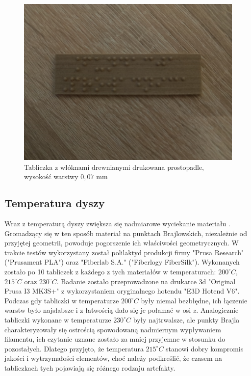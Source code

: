\documentclass[12pt,a4paper]{article}
\begin{document}
\begin{figure}
\includegraphics[width=\linewidth]{sgn_wood.jpg}
\caption{Tabliczka z włóknami drewnianymi drukowana prostopadle, wysokość warstwy $0{,}07 \text{ mm}$}
\end{figure}

\subsection{Temperatura dyszy}
Wraz z temperaturą dyszy zwiększa się nadmiarowe wyciekanie materiału \cite{3dparameters}. Gromadzący się w ten sposób materiał na punktach Brajlowskich, niezależnie od przyjętej geometrii, powoduje pogorszenie ich właściwości geometrycznych.
W trakcie testów wykorzystany został polilaktyd produkcji firmy "Prusa Research" ("Prusament PLA") oraz "Fiberlab S.A." ("Fiberlogy FiberSilk"). Wykonanych zostało po 10 tabliczek z każdego z tych materiałów w temperaturach: $200^{\circ} C$, $215^{\circ} C$ oraz $230^{\circ} C$. Badanie zostało przeprowadzone na drukarce 3d "Original Prusa I3 MK3S+" z wykorzystaniem oryginalnego hotendu "E3D Hotend V6".
Podczas gdy tabliczki w temperaturze $200^{\circ} C$ były niemal bezbłędne, ich łączenie warstw było najsłabsze i z łatwością dało się je połamać w osi $z$. Analogicznie tabliczki wykonane w temperaturze $230^{\circ} C$ były najtrwalsze, ale punkty Brajla charakteryzowały się ostrością spowodowaną nadmiernym wypływaniem filamentu, ich czytanie uznane zostało za mniej przyjemne w stosunku do pozostałych. Dlatego przyjęto, że temperatura $215^{\circ} C$ stanowi dobry kompromis jakości i wytrzymałości elementów, choć należy podkreślić, że czasem na tabliczkach tych pojawiają się różnego rodzaju artefakty.
\end{document}
